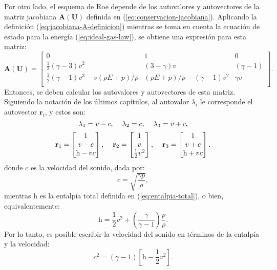 Por otro lado, el esquema de Roe depende de los autovalores y autovectores de la matriz jacobiana $\mathbf{A(\mathbf{U})}$ definida en (\ref{eq:conservacion-jacobiana}). Aplicando la definición (\ref{eq:jacobiana-A-definicion}) mientras se toma en cuenta la ecuación de estado para la energía (\ref{eq:ideal-gas-law}), se obtiene una expresión para esta matriz:
\begin{equation}
	\mathbf{A(\mathbf{U})} =
	\begin{bmatrix}
		0 & 1 & 0 \\
		\frac{1}{2}(\gamma - 3)v^2 & (3  - \gamma) v & (\gamma - 1) \\
		\frac{1}{2}(\gamma - 1)v^3 - v(\rho E+p)/\rho & (\rho E+p)/\rho-(\gamma - 1)v^2 & \gamma v \\
	\end{bmatrix}.
\end{equation}
Entonces, se deben calcular los autovalores y autovectores de esta matriz. Siguiendo la notación de los últimos capítulos, al autovalor $\lambda_i$ le corresponde el autovector $\mathbf{r}_i$, y estos son:
\begin{equation}
	\lambda_1 = v-c, \hspace{4mm}
	\lambda_2 = c, \hspace{4mm}
	\lambda_3 = v+c,
\end{equation}
\begin{equation}
	\mathbf{r}_1 = 
	\begin{bmatrix}
		1 \\
		v-c \\
		\mathrm{h}-vc
	\end{bmatrix},\hspace{4mm}
	\mathbf{r}_2 = 
	\begin{bmatrix}
		1 \\
		v \\
		\frac{1}{2}v^{2}
	\end{bmatrix},\hspace{4mm}
	\mathbf{r}_3 = 
	\begin{bmatrix}
		1 \\
		v+c \\
		\mathrm{h}+vc
	\end{bmatrix}.
\end{equation}
donde $c$ es la velocidad del sonido, dada por:
\begin{equation}
	c = \sqrt{\frac{\gamma p}{\rho}},
\end{equation}
mientras $\mathrm{h}$ es la entalpía total definida en (\ref{eq:entalpia-total}), o bien, equivalentemente:
\begin{equation}
	\mathrm{h} = \frac{1}{2}v^2 + \left(\frac{\gamma}{\gamma - 1}\right)\frac{p}{\rho}.
\end{equation}
Por lo tanto, es posible escribir la velocidad del sonido en términos de la entalpía y la velocidad:
\begin{equation}
	c^2 = (\gamma - 1)\left[\mathrm{h} - \frac{1}{2}v^{2}\right].
\end{equation}
